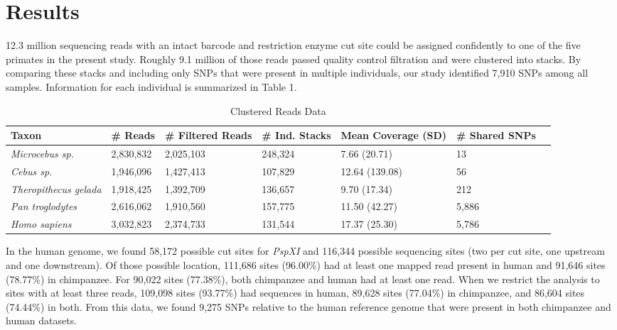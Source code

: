 \documentclass[12pt]{article}
\begin{document}
\section{Results}

12.3 million sequencing reads with an intact barcode and restriction enzyme cut site could be assigned confidently to one of the five primates in the present study. Roughly 9.1 million of those reads passed quality control filtration and were clustered into stacks. By comparing these stacks and including only SNPs that were present in multiple individuals, our study identified 7,910 SNPs among all samples. Information for each individual is summarized in Table 1. 

\begin{table}[h]
\caption{Clustered Reads Data}
\begin{center}
	\small
	\begin{tabular}{ p{3cm} || l || p{1.75cm} | p{1.75cm} || p{1.75cm} | p{1.75cm} | l }
		\hline
		Taxon                       & \# Reads  & \# Filtered Reads & \# Ind. Stacks & Mean Coverage (SD)  & \# Shared SNPs \\ \hline\hline
		\emph{Microcebus sp.}       & 2,830,832 & 2,025,103       & 248,324         &  7.66 (20.71)  & 13    \\ \hline
		\emph{Cebus sp.}            & 1,946,096 & 1,427,413       & 107,829         & 12.64 (139.08) & 56    \\ \hline
		\emph{Theropithecus gelada} & 1,918,425 & 1,392,709       & 136,657         &  9.70 (17.34)  & 212   \\ \hline
		\emph{Pan troglodytes}      & 2,616,062 & 1,910,560       & 157,775         & 11.50 (42.27)  & 5,886 \\ \hline
		\emph{Homo sapiens}         & 3,032,823 & 2,374,733       & 131,544         & 17.37 (25.30)  & 5,786 \\ \hline
	\end{tabular}
\end{center}
\end{table}

In the human genome, we found 58,172 possible cut sites for \emph{PspXI} and 116,344 possible sequencing sites (two per cut site, one upstream and one downstream). Of those possible location, 111,686 sites (96.00\%) had at least one mapped read present in human and 91,646 sites (78.77\%) in chimpanzee. For 90,022 sites (77.38\%), both chimpanzee and human had at least one read. When we restrict the analysis to sites with at least three reads, 109,098 sites (93.77\%) had sequences in human, 89,628 sites (77.04\%) in chimpanzee, and 86,604 sites (74.44\%) in both. From this data, we found 9,275 SNPs relative to the human reference genome that were present in both chimpanzee and human datasets.
\end{document}
